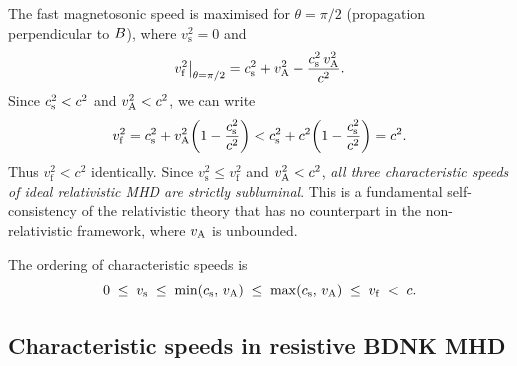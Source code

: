 The fast magnetosonic speed is maximised for $\theta=\pi/2$ (propagation
perpendicular to $B$), where $v_{\mathrm{s}}^{2}=0$ and
\begin{equation}
  v_{\mathrm{f}}^{2}\big|_{\theta=\pi/2}
  = c_{\mathrm{s}}^{2} + v_{\mathrm{A}}^{2} - \frac{c_{\mathrm{s}}^{2}\,v_{\mathrm{A}}^{2}}{c^{2}}.
  \label{eq:vf-perp}
\end{equation}
Since $c_{\mathrm{s}}^{2}<c^{2}$ and $v_{\mathrm{A}}^{2}<c^{2}$, we can write
\begin{equation}
  v_{\mathrm{f}}^{2}
  = c_{\mathrm{s}}^{2} + v_{\mathrm{A}}^{2}\!\left(1-\frac{c_{\mathrm{s}}^{2}}{c^{2}}\right)
  < c_{\mathrm{s}}^{2} + c^{2}\!\left(1-\frac{c_{\mathrm{s}}^{2}}{c^{2}}\right)
  = c^{2}.
  \label{eq:vf-causal-proof}
\end{equation}
Thus $v_{\mathrm{f}}^{2} < c^{2}$ identically.  Since
$v_{\mathrm{s}}^{2}\le v_{\mathrm{f}}^{2}$ and
$v_{\mathrm{A}}^{2}<c^{2}$, \emph{all three characteristic speeds of ideal
relativistic MHD are strictly subluminal}.  This is a fundamental
self-consistency of the relativistic theory that has no counterpart in the
non-relativistic framework, where $v_{\mathrm{A}}$ is unbounded.

The ordering of characteristic speeds is
\begin{equation}
  0 \;\le\; v_{\mathrm{s}} \;\le\; \min(c_{\mathrm{s}},\,v_{\mathrm{A}})
  \;\le\; \max(c_{\mathrm{s}},\,v_{\mathrm{A}}) \;\le\; v_{\mathrm{f}} \;<\; c.
  \label{eq:speed-ordering}
\end{equation}

\subsection{Characteristic speeds in resistive BDNK MHD}
\label{sec:char-speeds-resistive}

